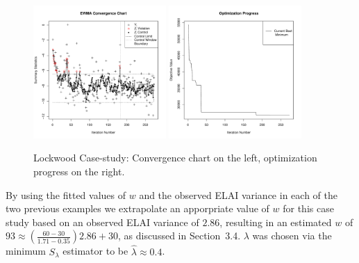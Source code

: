 \documentclass{article}
\begin{document}

%
\begin{figure}[htb]
        \centering
        \includegraphics[width=0.45\textwidth]{./figures/ewmaConvChartLock6Three20000End.pdf}
        \includegraphics[width=0.45\textwidth]{./figures/bestZLock6Three20000End.pdf}
        \caption{Lockwood Case-study: Convergence chart on the left, optimization progress on the right.}
        \label{lock6EWMAEnd}
\end{figure}
%
%

%
By using the fitted values of $w$ and the observed ELAI variance in each of 
the two previous examples we extrapolate an apporpriate value of $w$ for this 
case study based on an observed ELAI variance of $2.86$, resulting in an 
estimated $w$ of $93\approx\left(\frac{60-30}{1.71-0.35}\right)2.86+30$, 
as discussed in Section~3.4. $\lambda$ was chosen via the minimum 
$S_\lambda$ estimator to be $\hat\lambda\approx 0.4$.
\end{document}

